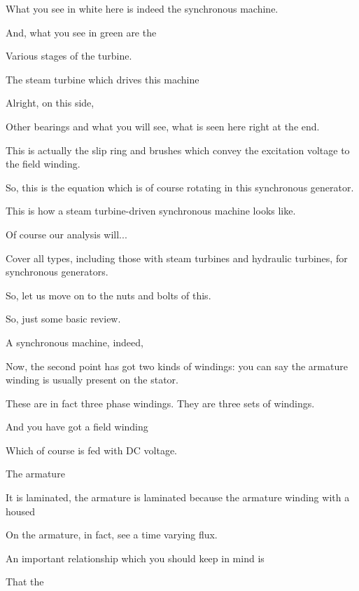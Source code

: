 \documentclass{article}
\begin{document}
What you see in white here is indeed the synchronous machine.

And, what you see in green are the

Various stages of the turbine.

The steam turbine which drives this machine

Alright, on this side,

Other bearings and what you will see, what is seen here right at the end.

This is actually the slip ring and brushes which convey the excitation voltage to the field winding.

So, this is the equation which is of course rotating in this synchronous generator.

This is how a steam turbine-driven synchronous machine looks like.

Of course our analysis will...

Cover all types, including those with steam turbines and hydraulic turbines, for synchronous generators.

So, let us move on to the nuts and bolts of this.

So, just some basic review.

A synchronous machine, indeed,

Now, the second point has got two kinds of windings: you can say the armature winding is usually present on the stator.

These are in fact three phase windings. They are three sets of windings.

And you have got a field winding

Which of course is fed with DC voltage.

The armature

It is laminated, the armature is laminated because the armature winding with a housed

On the armature, in fact, see a time varying flux.

An important relationship which you should keep in mind is

That the
\end{document}
